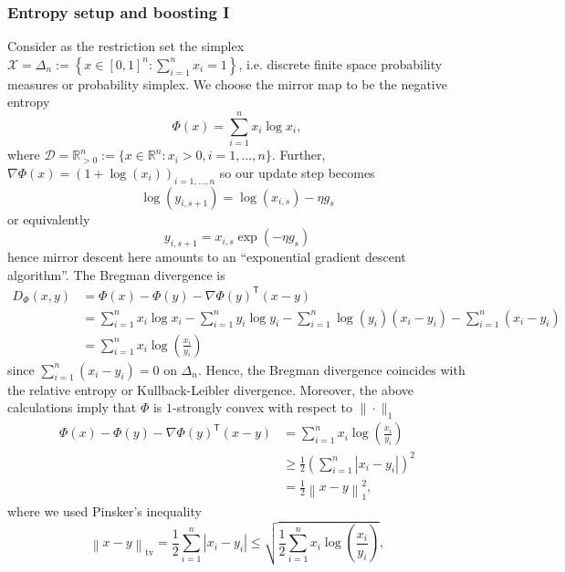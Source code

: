\subsubsection{Entropy setup and boosting I}
Consider  as the restriction set the simplex $\mathcal{X} = \Delta_n := \left\{x\in [0,1]^n: \sum_{i=1}^n x_i = 1\right\}$, i.e. discrete finite space probability measures or probability simplex. We choose the mirror map to be the negative entropy 
\begin{equation*}
	\Phi(x) = \sum_{i=1}^n x_i \log x_i,
\end{equation*}
where $\mathcal{D} = \mathbb{R}^n_{>0} := \{x \in \mathbb{R}^n \colon x_i > 0, i=1,\ldots,n \}$. Further, $\nabla \Phi(x) = \left(1 + \log(x_i)\right)_{i=1,\ldots,n}$ so our update step becomes
\begin{equation*}
	\log(y_{i, s+1}) = \log(x_{i, s}) - \eta g_s
\end{equation*}
or equivalently
\begin{equation*}
	y_{i, s+1} = x_{i, s}\exp\left(-\eta g_s \right)
\end{equation*}
hence mirror descent here amounts to an "`exponential gradient descent algorithm"'. The Bregman divergence is 
\begin{align*}
	D_\Phi(x, y) &= \Phi(x) - \Phi(y) - \nabla \Phi(y)^\mathsf{T}(x - y) \\
	& = \sum_{i=1}^n x_i \log x_i - \sum_{i=1}^n y_i \log y_i - \sum_{i=1}^n \log(y_i) (x_i - y_i) - \sum_{i=1}^n (x_i - y_i)	\\
	& = \sum_{i=1}^n x_i \log\left( \frac{x_i}{y_i} \right)
\end{align*}
since $\sum_{i=1}^n (x_i - y_i) = 0$ on $\Delta_n$. Hence, the Bregman divergence coincides with the relative entropy or Kullback-Leibler divergence. Moreover, the above calculations imply that $\Phi$ is $1$-strongly convex with respect to $\|\cdot\|_1$
\begin{align*}
	\Phi(x) - \Phi(y) - \nabla \Phi(y)^\mathsf{T}(x - y) & = \sum_{i=1}^n x_i \log\left( \frac{x_i}{y_i} \right) \\
	& \geq \frac{1}{2}\left(\sum_{i=1}^n|x_i - y_i|\right)^2 \\
	& = \frac{1}{2}\left\|x - y\right\|_1^2,
\end{align*}
where we used Pinsker's inequality 
\begin{equation*}
	\left\| x - y \right\|_\mathrm{tv} = \frac{1}{2}\sum_{i=1}^n|x_i - y_i| \leq \sqrt{\frac{1}{2} \sum_{i=1}^n x_i \log\left( \frac{x_i}{y_i} \right)},
\end{equation*}

